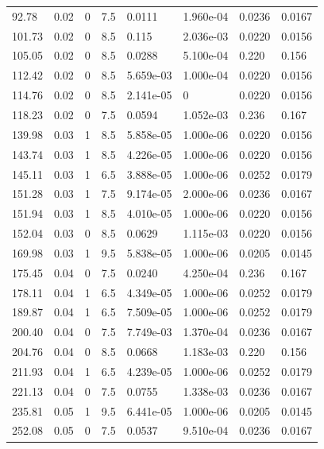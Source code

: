 \documentclass[preview]{standalone}
\begin{document}
{{\begin{tabular}{L{1.2cm}C{1.2cm} C{0.3cm}C{0.5cm} C{1.4cm}C{1.4cm} C{1.4cm}C{1.4cm}}
  92.78  &  0.02  & 0     & 7.5 &  0.0111  & 1.960e-04  & 0.0236 &  0.0167   \\ 
  101.73  &  0.02  & 0     & 8.5 &  0.115  & 2.036e-03  & 0.0220 &  0.0156   \\ 
  105.05  &  0.02  & 0     & 8.5 &  0.0288  & 5.100e-04  & 0.220 &  0.156   \\ 
  112.42  &  0.02  & 0     & 8.5 &  5.659e-03  & 1.000e-04  & 0.0220 &  0.0156   \\ 
  114.76  &  0.02  & 0     & 8.5 &  2.141e-05  & 0  & 0.0220 &  0.0156   \\ 
  118.23  &  0.02  & 0     & 7.5 &  0.0594  & 1.052e-03  & 0.236 &  0.167   \\ 
  139.98  &  0.03  & 1     & 8.5 &  5.858e-05  & 1.000e-06  & 0.0220 &  0.0156   \\ 
  143.74  &  0.03  & 1     & 8.5 &  4.226e-05  & 1.000e-06  & 0.0220 &  0.0156   \\ 
  145.11  &  0.03  & 1     & 6.5 &  3.888e-05  & 1.000e-06  & 0.0252 &  0.0179   \\ 
  151.28  &  0.03  & 1     & 7.5 &  9.174e-05  & 2.000e-06  & 0.0236 &  0.0167   \\ 
  151.94  &  0.03  & 1     & 8.5 &  4.010e-05  & 1.000e-06  & 0.0220 &  0.0156   \\ 
  152.04  &  0.03  & 0     & 8.5 &  0.0629  & 1.115e-03  & 0.0220 &  0.0156   \\ 
  169.98  &  0.03  & 1     & 9.5 &  5.838e-05  & 1.000e-06  & 0.0205 &  0.0145   \\ 
  175.45  &  0.04  & 0     & 7.5 &  0.0240  & 4.250e-04  & 0.236 &  0.167   \\ 
  178.11  &  0.04  & 1     & 6.5 &  4.349e-05  & 1.000e-06  & 0.0252 &  0.0179   \\ 
  189.87  &  0.04  & 1     & 6.5 &  7.509e-05  & 1.000e-06  & 0.0252 &  0.0179   \\ 
  200.40  &  0.04  & 0     & 7.5 &  7.749e-03  & 1.370e-04  & 0.0236 &  0.0167   \\ 
  204.76  &  0.04  & 0     & 8.5 &  0.0668  & 1.183e-03  & 0.220 &  0.156   \\ 
  211.93  &  0.04  & 1     & 6.5 &  4.239e-05  & 1.000e-06  & 0.0252 &  0.0179   \\ 
  221.13  &  0.04  & 0     & 7.5 &  0.0755  & 1.338e-03  & 0.0236 &  0.0167   \\ 
  235.81  &  0.05  & 1     & 9.5 &  6.441e-05  & 1.000e-06  & 0.0205 &  0.0145   \\ 
  252.08  &  0.05  & 0     & 7.5 &  0.0537  & 9.510e-04  & 0.0236 &  0.0167   \\ 

\end{tabular}}}
\end{document}

